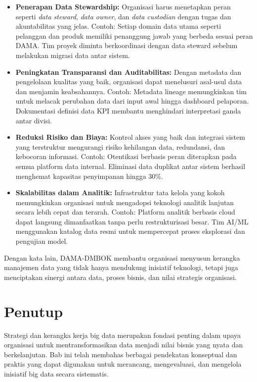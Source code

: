 \begin{itemize}
	\item \textbf{Penerapan Data Stewardship:} Organisasi harus menetapkan peran seperti \textit{data steward}, \textit{data owner}, dan \textit{data custodian} dengan tugas dan akuntabilitas yang jelas. Contoh: Setiap domain data utama seperti pelanggan dan produk memiliki penanggung jawab yang berbeda sesuai peran DAMA. Tim proyek diminta berkoordinasi dengan data steward sebelum melakukan migrasi data antar sistem.
	
	\item \textbf{Peningkatan Transparansi dan Auditabilitas:} Dengan metadata dan pengelolaan kualitas yang baik, organisasi dapat menelusuri asal-usul data dan menjamin keabsahannya. Contoh: Metadata lineage memungkinkan tim untuk melacak perubahan data dari input awal hingga dashboard pelaporan. Dokumentasi definisi data KPI membantu menghindari interpretasi ganda antar divisi.
	
	\item \textbf{Reduksi Risiko dan Biaya:} Kontrol akses yang baik dan integrasi sistem yang terstruktur mengurangi risiko kehilangan data, redundansi, dan kebocoran informasi. Contoh: Otentikasi berbasis peran diterapkan pada semua platform data internal. Eliminasi data duplikat antar sistem berhasil menghemat kapasitas penyimpanan hingga 30\%.
	
	\item \textbf{Skalabilitas dalam Analitik:} Infrastruktur tata kelola yang kokoh memungkinkan organisasi untuk mengadopsi teknologi analitik lanjutan secara lebih cepat dan terarah. Contoh: Platform analitik berbasis cloud dapat langsung dimanfaatkan tanpa perlu restrukturisasi besar. Tim AI/ML menggunakan katalog data resmi untuk mempercepat proses eksplorasi dan pengujian model.
\end{itemize}


Dengan kata lain, DAMA-DMBOK membantu organisasi menyusun kerangka manajemen data yang tidak hanya mendukung inisiatif teknologi, tetapi juga menciptakan sinergi antara data, proses bisnis, dan nilai strategis organisasi.

\section{Penutup}

Strategi dan kerangka kerja big data merupakan fondasi penting dalam upaya organisasi untuk mentransformasikan data menjadi nilai bisnis yang nyata dan berkelanjutan. Bab ini telah membahas berbagai pendekatan konseptual dan praktis yang dapat digunakan untuk merancang, mengevaluasi, dan mengelola inisiatif big data secara sistematis.

